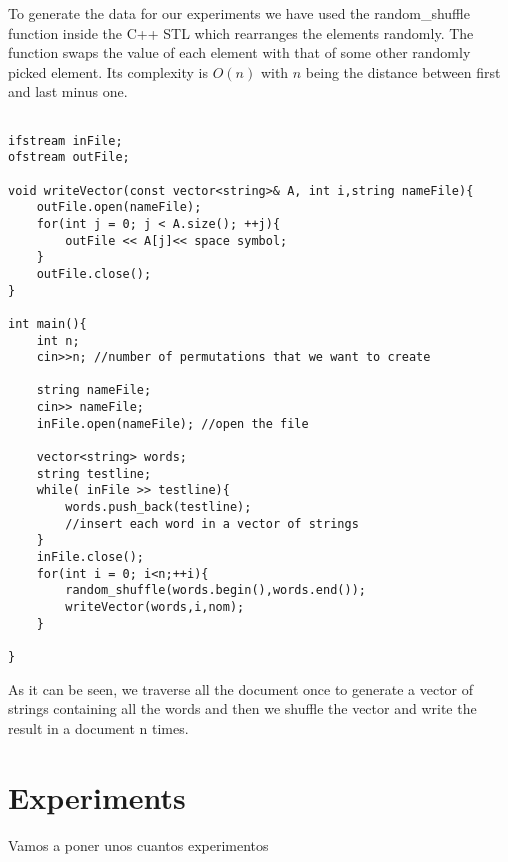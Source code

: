 \documentclass[12pt]{article}
\begin{document}
To generate the data for our experiments we have used the random\_shuffle function inside the C++ STL which rearranges the elements randomly. The function swaps the value of each element with that of some other randomly picked element. Its complexity is $O(n)$ with $n$ being  the distance between first and last minus one.

\begin{lstlisting}

ifstream inFile;
ofstream outFile;

void writeVector(const vector<string>& A, int i,string nameFile){
    outFile.open(nameFile);
    for(int j = 0; j < A.size(); ++j){
        outFile << A[j]<< space symbol;
    }
    outFile.close();
}

int main(){
    int n; 
    cin>>n; //number of permutations that we want to create
         
    string nameFile;
    cin>> nameFile; 
    inFile.open(nameFile); //open the file
    
    vector<string> words; 
    string testline;
    while( inFile >> testline){
    	words.push_back(testline); 
    	//insert each word in a vector of strings
    }
    inFile.close();
    for(int i = 0; i<n;++i){
    	random_shuffle(words.begin(),words.end()); 
    	writeVector(words,i,nom);
    }
    
}\end{lstlisting}


As it can be seen, we traverse all the document once to generate a vector of strings containing all the words and then we shuffle the vector and write the result in a document n times. \\

\section{Experiments}

Vamos a poner unos cuantos experimentos

%
\end{document}

